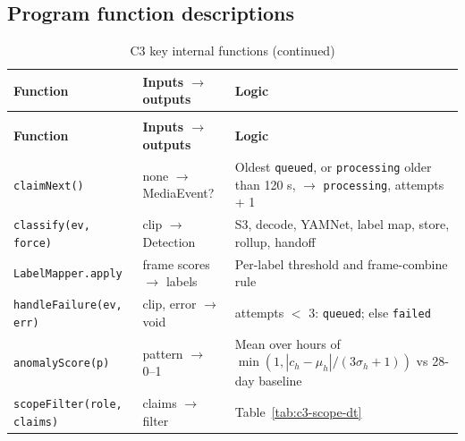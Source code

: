 \subsection{Program function descriptions}
\begin{longtable}{L{4.0cm}L{4.0cm}L{6.6cm}}
\caption{C3 key internal functions}\label{tab:c3-fn}\\
\toprule
\textbf{Function} & \textbf{Inputs $\rightarrow$ outputs} & \textbf{Logic} \\
\midrule
\endfirsthead
\caption[]{C3 key internal functions (continued)}\\
\toprule
\textbf{Function} & \textbf{Inputs $\rightarrow$ outputs} & \textbf{Logic} \\
\midrule
\endhead
\texttt{claimNext()} & none $\rightarrow$ MediaEvent? & Oldest \texttt{queued}, or \texttt{processing} older than 120 s, $\rightarrow$ \texttt{processing}, attempts + 1 \\
\texttt{classify(ev, force)} & clip $\rightarrow$ Detection & S3, decode, YAMNet, label map, store, rollup, handoff \\
\texttt{LabelMapper.\allowbreak apply} & frame scores $\rightarrow$ labels & Per-label threshold and frame-combine rule \\
\texttt{handleFailure(ev, err)} & clip, error $\rightarrow$ void & attempts $<$ 3: \texttt{queued}; else \texttt{failed} \\
\texttt{anomalyScore(p)} & pattern $\rightarrow$ 0--1 & Mean over hours of $\min(1, |c_h-\mu_h|/(3\sigma_h+1))$ vs 28-day baseline \\
\texttt{scopeFilter(role, claims)} & claims $\rightarrow$ filter & Table~\ref{tab:c3-scope-dt} \\
\bottomrule
\end{longtable}


